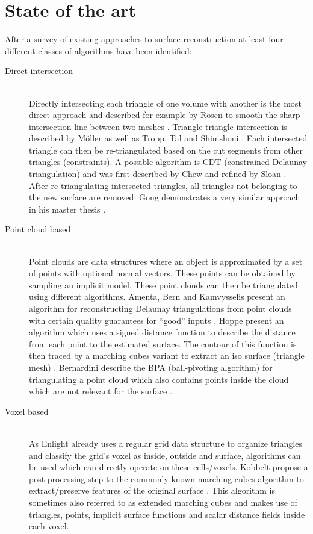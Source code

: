 
\chapter{State of the art}

After a survey of existing approaches to surface reconstruction at least four different classes of algorithms have been identified:

\begin{description}
	
	\item[Direct intersection] \hfill \\
	Directly intersecting each triangle of one volume with another is the most direct approach and described for example by Rosen to smooth the sharp intersection line between two meshes \cite{mesh_intersection}. Triangle-triangle intersection is described by M\"oller \cite{tri_tri_intersection_moller} as well as Tropp, Tal and Shimshoni \cite{tri_tri_intersection_2}. Each intersected triangle can then be re-triangulated based on the cut segments from other triangles (constraints). A possible algorithm is CDT (constrained Delaunay triangulation) and was first described by Chew \cite{CDT} and refined by Sloan \cite{CDT_fast}. After re-triangulating intersected triangles, all triangles not belonging to the new surface are removed. Gong demonstrates a very similar approach in his master thesis \cite{cutter_workpiece_engagement}.
	
	\item[Point cloud based] \hfill \\
	Point clouds are data structures where an object is approximated by a set of points with optional normal vectors. These points can be obtained \eg by sampling an implicit model. These point clouds can then be triangulated using different algorithms. 
	Amenta, Bern and Kamvysselis present an algorithm for reconstructing Delaunay triangulations from point clouds with certain quality guarantees for \enquote{good} inputs \cite{vornoi_surface_reconstruction}.
	Hoppe \etal present an algorithm which uses a signed distance function to describe the distance from each point to the estimated surface. The contour of this function is then traced by a marching cubes variant to extract an iso surface (triangle mesh) \cite{surface_reconstruction}.
	Bernardini \etal describe the BPA (ball-pivoting algorithm) for triangulating a point cloud which also contains points inside the cloud which are not relevant for the surface \cite{BPA}.
	
	
	\item[Voxel based] \hfill \\
	As Enlight already uses a regular grid data structure to organize triangles and classify the grid's voxel as inside, outside and surface, algorithms can be used which can directly operate on these cells/voxels.
	Kobbelt \etal propose a post-processing step to the commonly known marching cubes algorithm to extract/preserve features of the original surface \cite{extended_marching_cubes}. This algorithm is sometimes also referred to as extended marching cubes and makes use of triangles, points, implicit surface functions and scalar distance fields inside each voxel.
	

\end{description}
